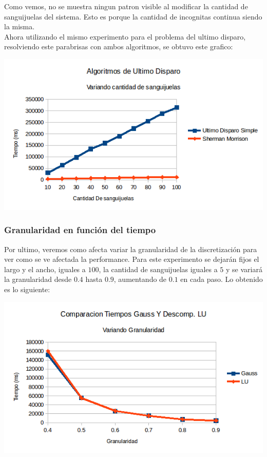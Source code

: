 Como vemos, no se muestra ningun patron visible al modificar la cantidad de sanguijuelas del sistema. Esto es porque la cantidad de incognitas continua siendo la misma.
\\
Ahora utilizando el mismo experimento para el problema del ultimo disparo, resolviendo este parabrisas con ambos algoritmos, se obtuvo este grafico:

\begin{center}
 \includegraphics[width=400pt]{imagenes/testeo/sangSalv.png}
\end{center}
\subsubsection{Granularidad en función del tiempo}
Por ultimo, veremos como afecta variar la granularidad de la discretización para ver como se ve afectada la performance. Para este experimento se dejarán fijos el largo y el ancho, iguales a $100$, la cantidad de sanguijuelas iguales a $5$ y se variará la granularidad desde $0.4$ hasta $0.9$, aumentando de $0.1$ en cada paso. Lo obtenido es lo siguiente:

\begin{center}
 \includegraphics[width=400pt]{imagenes/testeo/granuGauss.png}
\end{center}

